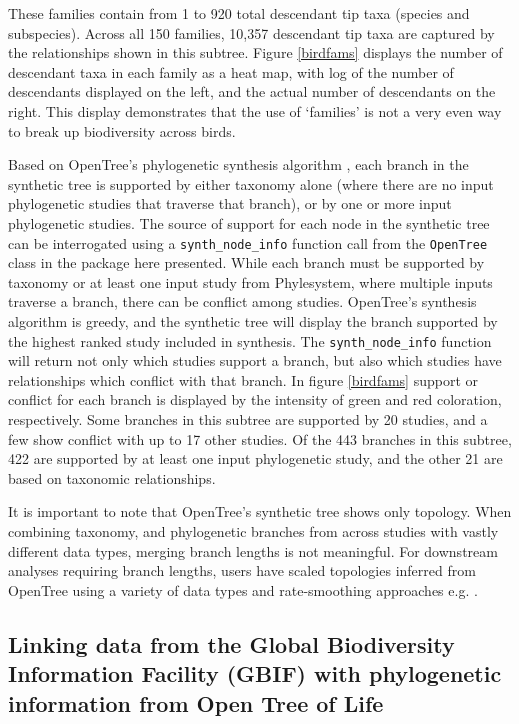 \documentclass[oupdraft]{sysbio_sse}
\begin{document}
These families contain from 1 to 920 total descendant tip taxa (species and subspecies).
Across all 150 families, 10,357 descendant tip taxa are captured by the relationships shown in this subtree.
Figure \ref{birdfams} displays the number of descendant taxa in each family as a heat map, with log of the number of descendants displayed on the left, and the actual number of descendants on the right.
This display demonstrates that the use of `families' is not a very even way to break up biodiversity across birds.

Based on OpenTree's phylogenetic synthesis algorithm \citep{redelings_supertree_2017}, each branch in the synthetic tree is supported
by either taxonomy alone (where there are no input phylogenetic studies that traverse that branch), or by one or more input phylogenetic studies.
The source of support for each node in the synthetic tree can be interrogated using a \texttt{synth\_node\_info} function call from the \texttt{OpenTree} class in the package here presented.
While each branch must be supported by taxonomy or at least one input study from Phylesystem, where multiple inputs traverse a branch, there can be conflict among studies.
OpenTree's synthesis algorithm is greedy, and the synthetic tree will display the branch supported by the highest ranked study included in synthesis.
The \texttt{synth\_node\_info} function will return not only which studies support a branch, but also which studies have relationships which conflict with that branch.
In figure \ref{birdfams} support or conflict for each branch is displayed by the intensity of green and red coloration, respectively. Some branches in this subtree are supported by 20 studies, and a few show conflict with up to 17 other studies. Of the 443 branches in this subtree, 422 are supported by at least one input phylogenetic study, and the other 21 are based on taxonomic relationships.

It is important to note that OpenTree's synthetic tree shows only topology. When combining taxonomy, and phylogenetic branches from across studies with vastly different data types, merging branch lengths is not meaningful. For downstream analyses requiring branch lengths, users have scaled topologies inferred from OpenTree using a variety of data types and rate-smoothing approaches e.g. \citep{smith2018constructing, smith2019pyphlawd, eastman2013congruification, allen2019spatial, li2019common, uyeda2017evolution, geffroy2020evolutionary, jantzen2019effects, sanchez-reyes_datelife_2019}.

\subsection{Linking data from the Global Biodiversity Information Facility (GBIF) with phylogenetic information from Open Tree of Life}
\end{document}
